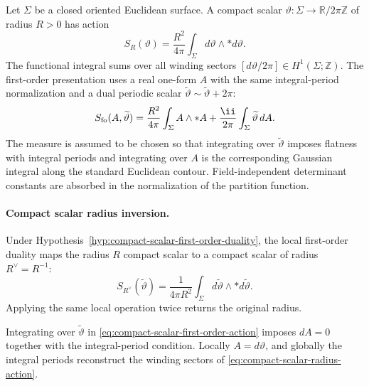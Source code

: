 \begin{hypothesis}
\label{hyp:compact-scalar-first-order-duality}
Let \(\Sigma\) be a closed oriented Euclidean surface.  A compact scalar
\(\vartheta:\Sigma\to\mathbb R/2\pi\mathbb Z\) of radius \(R>0\) has action
\begin{equation}
  S_R(\vartheta)
  =
  \frac{R^2}{4\pi}
  \int_\Sigma d\vartheta\wedge *d\vartheta .
  \label{eq:compact-scalar-radius-action}
\end{equation}
The functional integral sums over all winding sectors
\([d\vartheta/2\pi]\in H^1(\Sigma;\mathbb Z)\).  The first-order presentation
uses a real one-form \(A\) with the same integral-period normalization and a
dual periodic scalar \(\widetilde\vartheta\sim
\widetilde\vartheta+2\pi\):
\begin{equation}
  S_{\rm fo}(A,\widetilde\vartheta)
  =
  \frac{R^2}{4\pi}\int_\Sigma A\wedge *A
  +
  \frac{\ii}{2\pi}\int_\Sigma
  \widetilde\vartheta\, dA .
  \label{eq:compact-scalar-first-order-action}
\end{equation}
The measure is assumed to be chosen so that integrating over
\(\widetilde\vartheta\) imposes flatness with integral periods and integrating
over \(A\) is the corresponding Gaussian integral along the standard
Euclidean contour.  Field-independent determinant constants are absorbed in
the normalization of the partition function.
\end{hypothesis}

\paragraph{Compact scalar radius inversion.}
Under Hypothesis~\ref{hyp:compact-scalar-first-order-duality}, the local
first-order duality maps the radius \(R\) compact scalar to a compact scalar
of radius \(R^\vee=R^{-1}\):
\begin{equation}
  S_{R^\vee}(\widetilde\vartheta)
  =
  \frac{1}{4\pi R^2}
  \int_\Sigma d\widetilde\vartheta\wedge *d\widetilde\vartheta .
  \label{eq:compact-scalar-dual-radius-action}
\end{equation}
Applying the same local operation twice returns the original radius.

Integrating over \(\widetilde\vartheta\) in
\eqref{eq:compact-scalar-first-order-action} imposes \(dA=0\) together with
the integral-period condition.  Locally \(A=d\vartheta\), and globally the
integral periods reconstruct the winding sectors of
\eqref{eq:compact-scalar-radius-action}.


